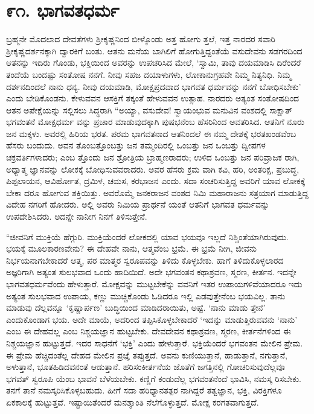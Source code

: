 
\chapter{೯೧. ಭಾಗವತಧರ್ಮ}

ಬ್ರಹ್ಮನೇ ಮೊದಲಾದ ದೇವತೆಗಳು ಶ್ರೀಕೃಷ್ಣನಿಂದ ಬೀಳ್ಕೊಂಡು ಅತ್ತ ಹೋಗು ತ್ತಲೆ, ಇತ್ತ ನಾರದರ ಸವಾರಿ ಶ್ರೀಕೃಷ್ಣದರ್ಶನಕ್ಕಾಗಿ ದ್ವಾರಕಿಗೆ ಬಂತು. ಆತನು ಮನೆಯ ಬಾಗಿಲಿಗೆ ಹೋಗುತ್ತಿದ್ದಂತೆಯೆ ವಸುದೇವನು ಸಡಗರದಿಂದ ಆತನನ್ನು ಇದಿರು ಗೊಂಡು, ಭಕ್ತಿಯಿಂದ ಅವರನ್ನು ಉಪಚರಿಸಿದ ಮೇಲೆ, ‘ಸ್ವಾಮಿ, ತಾವು ದಯಮಾಡಿಸಿ ದಿರೆಂದರೆ ತಂದೆಯೆ ಬಂದಷ್ಟು ಸಂತೋಷ ನನಗೆ. ನೀವು ಸಹಜ ದಯಾಳುಗಳು, ಲೋಕಾನುಗ್ರಹವೇ ನಿಮ್ಮ ನಿತ್ಯನಿಧಿ. ನಿಮ್ಮ ದರ್ಶನದಿಂದಲೆ ನಾನು ಧನ್ಯ. ನೀವು ದಯಮಾಡಿ, ಮೋಕ್ಷಪ್ರದವಾದ ಭಾಗವತ ಧರ್ಮವನ್ನು ನನಗೆ ಬೋಧಿಸಬೇಕು’ ಎಂದು ಬೇಡಿಕೊಂಡನು. ಕೇಳುವವನ ಆಸಕ್ತಿಗೆ ತಕ್ಕಂತೆ ಹೇಳುವವನ ಉತ್ಸಾಹ. ನಾರದರು ಅತ್ಯಂತ ಸಂತೋಷದಿಂದ ಆತನ ಅಪೇಕ್ಷೆಯನ್ನು ಸಲ್ಲಿಸಲು ಸಿದ್ಧರಾಗಿ “ಅಯ್ಯಾ, ವಸುದೇವ! ಸ್ವಾಯಂಭುವ ಮನುವಿನ ವಂಶದಲ್ಲಿ ಸಾಕ್ಷಾತ್ ಭಗವಂತನೆ ಮೋಕ್ಷಧರ್ಮ ವನ್ನು ಪ್ರಚಾರ ಮಾಡುವುದಕ್ಕಾಗಿ ಪುಷಭನೆಂಬ ಹೆಸರಿನಿಂದ ಅವತರಿಸಿದ. ಆತನಿಗೆ ನೂರು ಜನ ಮಕ್ಕಳು. ಅವರಲ್ಲಿ ಹಿರಿಯ ಭರತ. ಪರಮ ಭಾಗವತನಾದ ಆತನಿಂದಲೆ ಈ ನಮ್ಮ ದೇಶಕ್ಕೆ ಭರತಖಂಡವೆಂಬ ಹೆಸರು ಬಂದುದು. ಅವನ ತೊಂಬತ್ತೊಂಬತ್ತು ಜನ ತಮ್ಮಂದಿರಲ್ಲಿ ಒಂಬತ್ತು ಜನ ಒಂಬತ್ತು ದ್ವೀಪಗಳ ಚಕ್ರವರ್ತಿಗಳಾದರು; ಎಂಬ ತ್ತೊಂದು ಜನ ಶ್ರೋತ್ರಿಯ ಬ್ರಾಹ್ಮಣರಾದರು; ಉಳಿದ ಒಂಬತ್ತು ಜನ ಪರಿವ್ರಾಜಕ ರಾಗಿ, ಅಧ್ಯಾತ್ಮ ಜ್ಞಾನವನ್ನು ಲೋಕಕ್ಕೆ ಬೋಧಿಸುವವರಾದರು. ಅವರ ಹೆಸರು ಕ್ರಮ ವಾಗಿ ಕವಿ, ಹರಿ, ಅಂತರಿಕ್ಷ, ಪ್ರಬುದ್ಧ, ಪಿಪ್ಪಲಾಯನ, ಆವಿರ್ಹೋತ, ದ್ರಮಿಳ, ಚಮಸ, ಕರಭಾಜನ ಎಂದು. ಸದಾ ಸಂಚರಿಸುತ್ತಿದ್ದ ಅವರಿಗೆ ಯಾವ ಲೋಕಕ್ಕೆ ಬೇಕಾ ದರೂ ಹೋಗುವ ಶಕ್ತಿಯಿತ್ತು. ಅವರೊಮ್ಮೆ ಜನಕರಾಜನ ವಂಶದ ನಿಮಿ ಮಹಾರಾಜನು ಸತ್ರಯಾಗ ಮಾಡುತ್ತಿದ್ದ ವಿದೇಹ ನಗರಿಗೆ ಹೋದರು. ಅಲ್ಲಿ ಅವರು ನಿಮಿಯ ಪ್ರಾರ್ಥನೆ ಯಂತೆ ಆತನಿಗೆ ಭಾಗವತ ಧರ್ಮವನ್ನು ಉಪದೇಶಿಸಿದರು. ಅದನ್ನೇ ನಾನೀಗ ನಿನಗೆ ತಿಳಿಸುತ್ತೇನೆ.

“ಜೀವನಿಗೆ ಮುಕ್ತಿಯೆ ಹೆಗ್ಗುರಿ. ಮುಕ್ತಿಯೆಂದರೆ ಲೋಕದಲ್ಲಿ ಯಾವ ಭಯವೂ ಇಲ್ಲದೆ ನಿಶ್ಚಿಂತೆಯಾಗಿರುವುದು. ಭಯಕ್ಕೆ ಮೂಲಕಾರಣವೇನು? ಈ ದೇಹವೇ ನಾನು, ಆತ್ಮವೆಂಬ ಭ್ರಮೆ. ಈ ಭ್ರಮೆ ನೀಗಿ, ಜೀವನು ನಿರ್ಭಯನಾಗಬೇಕಾದರೆ ಆತ್ಮ, ಪರ ಮಾತ್ಮರ ಸ್ವರೂಪವನ್ನು ತಿಳಿದು ಕೊಳ್ಳಬೇಕು. ಹಾಗೆ ತಿಳಿದುಕೊಳ್ಳಲಾರದ ಅಜ್ಞರಿಗಾಗಿ ಅತ್ಯಂತ ಸುಲಭವಾದ ಒಂದು ಹಾದಿಯಿದೆ. ಅದೇ ಭಗವಂತನ ಕಥಾಶ್ರವಣ, ಸ್ಮರಣ, ಕೀರ್ತನ. ಇದನ್ನೇ ಭಾಗವತಧರ್ಮವೆಂದು ಹೇಳುತ್ತಾರೆ. ಮೋಕ್ಷವನ್ನು ಮುಟ್ಟಬೇಕೆನ್ನು ವವನಿಗೆ ಇತರ ಉಪಾಯಗಳಿವೆಯಾದರೂ ಇದು ಅತ್ಯಂತ ಸುಲಭವಾದ ಉಪಾಯ, ಕಣ್ಣು ಮುಚ್ಚಿಕೊಂಡು ಓಡಿದರೂ ಇಲ್ಲಿ ಎಡವುತ್ತೇನೆಂಬ ಭಯವಿಲ್ಲ. ತಾನು ಮಾಡುವು ದೆಲ್ಲವನ್ನೂ ‘ಕೃಷ್ಣಾರ್ಪಣ’ ಬುದ್ಧಿಯಿಂದ ಮಾಡಿದರಾಯಿತು, ಅಷ್ಟೆ. ‘ನಾನು ಮಾಡು ತ್ತೇನೆ’ ಎಂದುಕೊಂಡಾಗ ಭಯ. ಅದೇ ಮಾಯೆ, ಅದರಿಂದ ತಪ್ಪಿಸಿಕೊಳ್ಳಬೇಕಾದರೆ ‘ಇದನ್ನು ಮಾಡುತ್ತಿರುವವನು ‘ನಾನು’ ಎಂಬ ಈ ದೇಹವಲ್ಲ ಎಂಬ ನಿಶ್ಚಯಜ್ಞಾನ ಹುಟ್ಟಬೇಕು. ದೇವದೇವನ ಕಥಾಶ್ರವಣ, ಸ್ಮರಣ, ಕೀರ್ತನೆಗಳಿಂದ ಈ ನಿಶ್ಚಯಜ್ಞಾನ ಹುಟ್ಟುತ್ತದೆ. ಇದರ ಸಾಧನೆಗೆ ‘ಭಕ್ತಿ’ ಎಂದು ಹೇಳುತ್ತಾರೆ. ಭಕ್ತಿಯೆಂದರೆ ಭಗವಂತನ ಮೇಲಿನ ಪ್ರೇಮ. ಈ ಪ್ರೇಮ ಹೆಚ್ಚಿದಂತೆಲ್ಲ ದೇಹದ ಮೇಲಿನ ಪ್ರಜ್ಞೆ ತಪ್ಪುತ್ತದೆ. ಅವನು ಕುಣಿಯುತ್ತಾನೆ, ಹಾಡುತ್ತಾನೆ, ನಗುತ್ತಾನೆ, ಅಳುತ್ತಾನೆ, ಭೂತಹಿಡಿದವನಂತೆ ಆಡುತ್ತಾನೆ. ಹರಿಸಂಕೀರ್ತನೆಯ ಜೊತೆಗೆ ಜಗತ್ತಿನಲ್ಲಿ ಗೋಚರಿಸುವುದೆಲ್ಲವೂ ಭಗವತ್ ಸ್ವರೂಪಿ ಯೆಂಬ ಭಾವನೆ ಬೆಳೆಯಬೇಕು. ಕಣ್ಣಿಗೆ ಕಂಡುದೆಲ್ಲ ಭಗವಂತನೆಂದೆ ಭಾವಿಸಿ, ನಮಸ್ಕ ರಿಸಬೇಕು. ತನಗೆ ತಾನೆ ನಮಸ್ಕರಿಸಿಕೊಳ್ಳಬಹುದು. ಹೀಗೆ ಸದಾ ಹರಿಧ್ಯಾನತತ್ಪರ ನಾಗಿದ್ದರೆ ತತ್ವಜ್ಞಾನ, ಭಕ್ತಿ, ವಿರಕ್ತಿಗಳೂ ಏಕಕಾಲಕ್ಕೆ ಹುಟ್ಟುತ್ತವೆ. ಇಷ್ಟಾಯಿತೆಂದರೆ ಮನಶ್ಶಾಂತಿ ನೆಲೆಗೊಳ್ಳುತ್ತದೆ. ಮೋಕ್ಷ ಕರಗತವಾಗುತ್ತದೆ.

